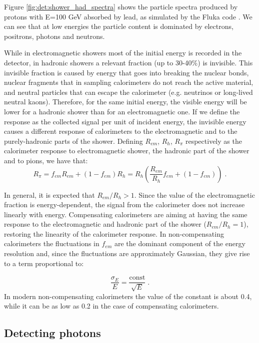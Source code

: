 Figure \ref{fig:det:shower_had_spectra} shows the particle spectra produced by protons with E=100 GeV absorbed by lead, as simulated by the Fluka code \cite{Ferrari:898301}. We can see that at low energies the particle content is dominated by electrons, positrons, photons and neutrons.

While in electromagnetic showers most of the initial energy is recorded in the detector, in hadronic showers a relevant fraction (up to 30-40\%) is invisible. This invisible fraction is caused by energy that goes into breaking the nuclear bonds, nuclear fragments that in sampling calorimeters do not reach the active material, and neutral particles that can escape the calorimeter (e.g. neutrinos or long-lived neutral kaons). Therefore, for the same initial energy, the visible energy will be lower for a hadronic shower than for an electromagnetic one. If we define the response as the collected signal per unit of incident energy, the invisible energy causes a different response of calorimeters to the electromagnetic and to the purely-hadronic parts of the shower. Defining $R_{em}$, $R_{h}$, $R_{\pi}$ respectively as the calorimeter response to electromagnetic shower, the hadronic part of the shower and to pions, we have that:
\begin{equation}
R_{\pi} = f_{em}R_{em} + (1-f_{em}) R_h = R_h \left( \frac{R_{em}}{R_{h}}f_{em} + (1-f_{em})  \right) \; . \nonumber
\end{equation}

In general, it is expected that $R_{em}/R_{h}>1$. Since the value of the electromagnetic fraction is energy-dependent, the signal from the calorimeter does not increase linearly with energy. Compensating calorimeters are aiming at having the same response to the electromagnetic and hadronic part of the shower ($R_{em}/R_{h}=1$), restoring the linearity of the calorimeter response. In non-compensating calorimeters the fluctuations in $f_{em}$ are the dominant component of the energy resolution and, since the fluctuations are approximately Gaussian,
they give rise to a term proportional to:

\begin{equation}
\frac{\sigma_E}{E} = \frac{\mathrm{const}}{\sqrt{E}}  \; . \nonumber
\end{equation}
In modern non-compensating calorimeters the value of the constant is about 0.4, while it can be as low as 0.2 in the case of compensating calorimeters.


\subsection{Detecting photons}

